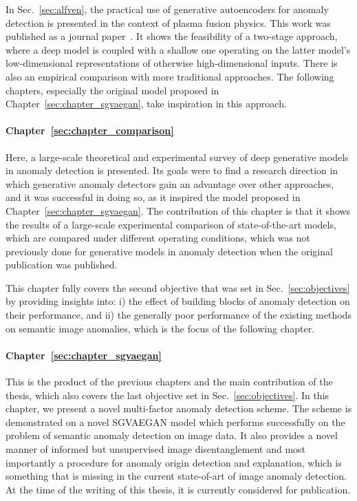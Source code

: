 In Sec.~\ref{sec:alfven}, the practical use of generative autoencoders for anomaly detection is presented in the context of plasma fusion physics. This work was published as a journal paper~\cite{vskvara2020detection}. It shows the feasibility of a two-stage approach, where a deep model is coupled with a shallow one operating on the latter model's low-dimensional representations of otherwise high-dimensional inputs. There is also an empirical comparison with more traditional approaches. The following chapters, especially the original model proposed in Chapter~\ref{sec:chapter_sgvaegan}, take inspiration in this approach.

\paragraph{Chapter~\ref{sec:chapter_comparison}} Here, a large-scale theoretical and experimental survey of deep generative models in anomaly detection is presented. Its goals were to find a research direction in which generative anomaly detectors gain an advantage over other approaches, and it was successful in doing so, as it inspired the model proposed in Chapter~\ref{sec:chapter_sgvaegan}. The contribution of this chapter is that it shows the results of a large-scale experimental comparison of state-of-the-art models, which are compared under different operating conditions, which was not previously done for generative models in anomaly detection when the original publication \cite{vskvara2021comparison} was published.

This chapter fully covers the second objective that was set in Sec.~\ref{sec:objectives} by providing insights into: i) the effect of building blocks of anomaly detection on their performance, and ii) the generally poor performance of the existing methods on semantic image anomalies, which is the focus of the following chapter.

\paragraph{Chapter~\ref{sec:chapter_sgvaegan}} This is the product of the previous chapters and the main contribution of the thesis, which also covers the last objective set in Sec.~\ref{sec:objectives}. In this chapter, we present a novel multi-factor anomaly detection scheme. The scheme is demonstrated on a novel SGVAEGAN model which performs successfully on the problem of semantic anomaly detection on image data. It also provides a novel manner of informed but unsupervised image disentanglement and most importantly a procedure for anomaly origin detection and explanation, which is something that is missing in the current state-of-art of image anomaly detection. At the time of the writing of this thesis, it is currently considered for publication.


